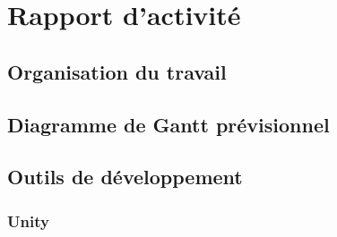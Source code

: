 \section{Rapport d'activité}

\subsection{Organisation du travail}


\subsection{Diagramme de Gantt prévisionnel}


\subsection{Outils de développement}
\subsubsection{Unity}
